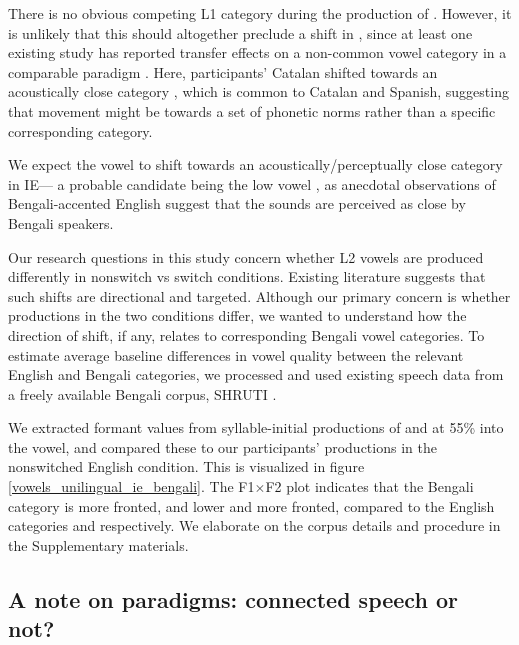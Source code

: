 \documentclass[12 pt]{article}
\newcommand{\nt}[1]{\textipa{[#1]}} %
\begin{document}

There is no obvious competing L1 category during the production of \nt{2}. However, it is unlikely that this should altogether preclude a shift in \nt{2}, since at least one existing study has reported transfer effects on a non-common vowel category in a comparable paradigm \citep{simonet2014phonetic}. Here, participants' Catalan \nt{O} shifted towards an acoustically close category \nt{o}, which is common to Catalan and Spanish, suggesting that movement might be towards a set of phonetic norms rather than a specific corresponding category. 

We expect the vowel \nt{2} to shift towards an acoustically/perceptually close category in IE--- a probable candidate being the low vowel \nt{a:}, as anecdotal observations of Bengali-accented English suggest that the sounds are perceived as close by Bengali speakers. 


Our research questions in this study concern whether L2 vowels are produced differently in nonswitch vs switch conditions. Existing literature suggests that such shifts are directional and targeted. Although our primary concern is whether productions in the two conditions differ, we wanted to understand how the direction of shift, if any, relates to corresponding Bengali vowel categories. To estimate average baseline differences in vowel quality between the relevant English and Bengali categories, we processed and used existing speech data from a freely available Bengali corpus, SHRUTI \citep{shruticorpus}. 

We extracted formant values from syllable-initial productions of \nt{\ae} and \nt{a:} at 55\% into the vowel, and compared these to our participants' productions in the nonswitched English condition. This is visualized in figure \ref{vowels_unilingual_ie_bengali}. 
The F1$\times$F2 plot indicates that the Bengali category \nt{\ae} is more fronted, and \nt{a:} lower and more fronted, compared to the English categories \nt{\ae} and \nt{2} respectively. We elaborate on the corpus details and procedure in the Supplementary materials.

\subsection{A note on paradigms: connected speech or not?} \label{paradigms}
\end{document}
